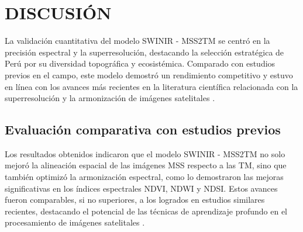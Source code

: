 \Chapter{}


\chapter{DISCUSIÓN}

    La validación cuantitativa del modelo SWINIR - MSS2TM se centró en la precisión espectral y la superresolución, destacando la selección estratégica de Perú por su diversidad topográfica y ecosistémica. Comparado con estudios previos en el campo, este modelo demostró un rendimiento competitivo y estuvo en línea con los avances más recientes en la literatura científica relacionada con la superresolución y la armonización de imágenes satelitales .

    \section{Evaluación comparativa con estudios previos}
        Los resultados obtenidos indicaron que el modelo SWINIR - MSS2TM no solo mejoró la alineación espacial de las imágenes MSS respecto a las TM, sino que también optimizó la armonización espectral, como lo demostraron las mejoras significativas en los índices espectrales NDVI, NDWI y NDSI. Estos avances fueron comparables, si no superiores, a los logrados en estudios similares recientes, destacando el potencial de las técnicas de aprendizaje profundo en el procesamiento de imágenes satelitales .

